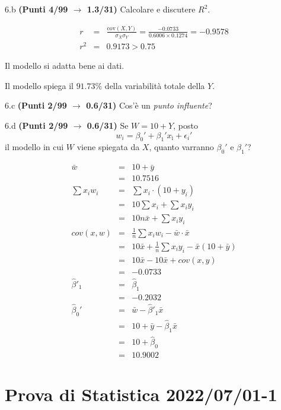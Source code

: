 \documentclass[
  11pt,
]{book}
\theoremstyle{mytheoremstyle}
\theoremstyle{mydefstyle}
\newenvironment{sol}
  {
  \begin{tcolorbox}[enhanced,breakable,arc=0.1mm,boxrule=1pt,colback=white,colframe=iblue,
  title=\bf \fontfamily{lmss}\selectfont \hspace{.5 cm} Soluzione,drop fuzzy shadow]

}{
\end{tcolorbox}
  }
\begin{document}
6.b \textbf{(Punti 4/99 \(\rightarrow\) 1.3/31)} Calcolare e discutere \(R^2\).

\begin{sol}
\begin{eqnarray*}
r&=&\frac{\text{cov}(X,Y)}{\sigma_X\sigma_Y}=\frac{ -0.0733 }{ 0.6006 \times 0.1274 }= -0.9578 \\ 
r^2&=& 0.9173 > 0.75
\end{eqnarray*}

Il modello si adatta bene ai dati.

Il modello spiega il \(91.73\%\) della variabilità totale della \(Y\).

\end{sol}

6.c \textbf{(Punti 2/99 \(\rightarrow\) 0.6/31)} Cos'è un \emph{punto influente}?

6.d \textbf{(Punti 2/99 \(\rightarrow\) 0.6/31)} Se \(W=10+ Y\), posto
\[w_i=\beta_0'+\beta_1'x_ì +\epsilon_i'\]
il modello in cui \(W\) viene spiegata da \(X\),
quanto varranno \(\beta_0'\) e \(\beta_1'\)?

\begin{sol}
\begin{eqnarray*}
  \bar w &=& 10+ \bar y\\
  &=& 10.7516\\
  \sum x_iw_i&=&\sum x_i\cdot (10+y_i)\\
  &=& 10\sum x_i +\sum x_i y_i\\
  &=& 10n\bar x +\sum x_i y_i\\
  cov(x,w)&=&\frac 1n\sum x_iw_i-\bar w\cdot\bar x\\
  &=&10\bar x +\frac 1n\sum x_i y_i-\bar x(10+\bar y)\\
  &=&10 \bar x - 10 \bar x +cov(x,y) \\
  &=& -0.0733\\
  \hat\beta'_1&=&\hat\beta_1\\
  &=&-0.2032\\
  \hat\beta_0'&=& \bar w -\hat\beta'_1\bar x\\
  &=& 10+\bar y-\hat\beta_1\bar x\\
  &=&10+\hat\beta_0\\
  &=&10.9002
\end{eqnarray*}

\end{sol}

\section{Prova di Statistica 2022/07/01-1}\label{prova-di-statistica-20220701-1}
\end{document}
